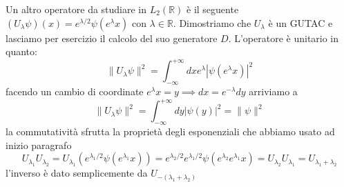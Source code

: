 \documentclass[12pt]{book}
\theoremstyle{plain}
\newcommand{\R}{\mathbb{R}}
\renewcommand{\H}{\mathcal{H}}
\theoremstyle{definition}
\theoremstyle{remark}
\begin{document}
Un altro operatore da studiare in $L_2(\R)$ è il seguente $(U_\lambda\psi)(x) = e^{\lambda/2}\psi(e^\lambda x)$ con $\lambda\in\R$. Dimostriamo che $U_\lambda$ è un GUTAC e lasciamo per esercizio il calcolo del suo generatore $D$. L'operatore è unitario in quanto:
\[\|U_\lambda\psi\|^2 = \int_{-\infty}^{+\infty}dx e^{\lambda}|\psi(e^\lambda x)|^2\]
facendo un cambio di coordinate $e^\lambda x = y \implies dx = e^{-\lambda} dy$ arriviamo a
\[\|U_\lambda\psi\|^2 = \int_{-\infty}^{+\infty}dy|\psi(y)|^2 = \|\psi\|^2\]
la commutatività sfrutta la proprietà degli esponenziali che abbiamo usato ad inizio paragrafo
\[U_{\lambda_1}U_{\lambda_2} = U_{\lambda_1}(e^{\lambda_1/2}\psi(e^{\lambda_1} x)) = e^{\lambda_2/2}e^{\lambda_1/2}\psi(e^{\lambda_2}e^{\lambda_1} x) = U_{\lambda_2}U_{\lambda_1} = U_{\lambda_1+\lambda_2}\]
l'inverso è dato semplicemente da $U_{-(\lambda_1+\lambda_2)}$


\end{document}
